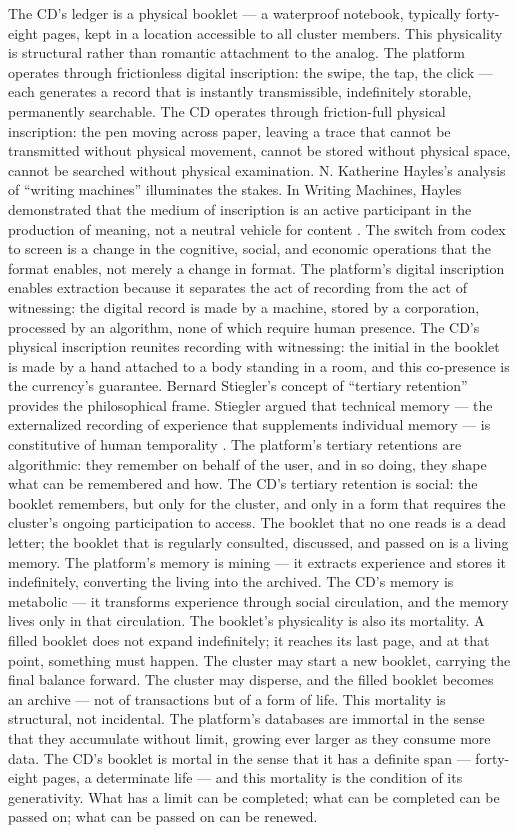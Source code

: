 The CD’s ledger is a physical booklet — a waterproof notebook, typically forty-eight pages, kept in a location accessible to all cluster members. This physicality is structural rather than romantic attachment to the analog. The platform operates through frictionless digital inscription: the swipe, the tap, the click — each generates a record that is instantly transmissible, indefinitely storable, permanently searchable. The CD operates through friction-full physical inscription: the pen moving across paper, leaving a trace that cannot be transmitted without physical movement, cannot be stored without physical space, cannot be searched without physical examination. N. Katherine Hayles’s analysis of “writing machines” illuminates the stakes. In Writing Machines, Hayles demonstrated that the medium of inscription is an active participant in the production of meaning, not a neutral vehicle for content \cite{hayles_2002}. The switch from codex to screen is a change in the cognitive, social, and economic operations that the format enables, not merely a change in format. The platform’s digital inscription enables extraction because it separates the act of recording from the act of witnessing: the digital record is made by a machine, stored by a corporation, processed by an algorithm, none of which require human presence. The CD’s physical inscription reunites recording with witnessing: the initial in the booklet is made by a hand attached to a body standing in a room, and this co-presence is the currency’s guarantee. Bernard Stiegler’s concept of “tertiary retention” provides the philosophical frame. Stiegler argued that technical memory — the externalized recording of experience that supplements individual memory — is constitutive of human temporality \cite{stiegler_1998}. The platform’s tertiary retentions are algorithmic: they remember on behalf of the user, and in so doing, they shape what can be remembered and how. The CD’s tertiary retention is social: the booklet remembers, but only for the cluster, and only in a form that requires the cluster’s ongoing participation to access. The booklet that no one reads is a dead letter; the booklet that is regularly consulted, discussed, and passed on is a living memory. The platform’s memory is mining — it extracts experience and stores it indefinitely, converting the living into the archived. The CD’s memory is metabolic — it transforms experience through social circulation, and the memory lives only in that circulation. The booklet’s physicality is also its mortality. A filled booklet does not expand indefinitely; it reaches its last page, and at that point, something must happen. The cluster may start a new booklet, carrying the final balance forward. The cluster may disperse, and the filled booklet becomes an archive — not of transactions but of a form of life. This mortality is structural, not incidental. The platform’s databases are immortal in the sense that they accumulate without limit, growing ever larger as they consume more data. The CD’s booklet is mortal in the sense that it has a definite span — forty-eight pages, a determinate life — and this mortality is the condition of its generativity. What has a limit can be completed; what can be completed can be passed on; what can be passed on can be renewed.

